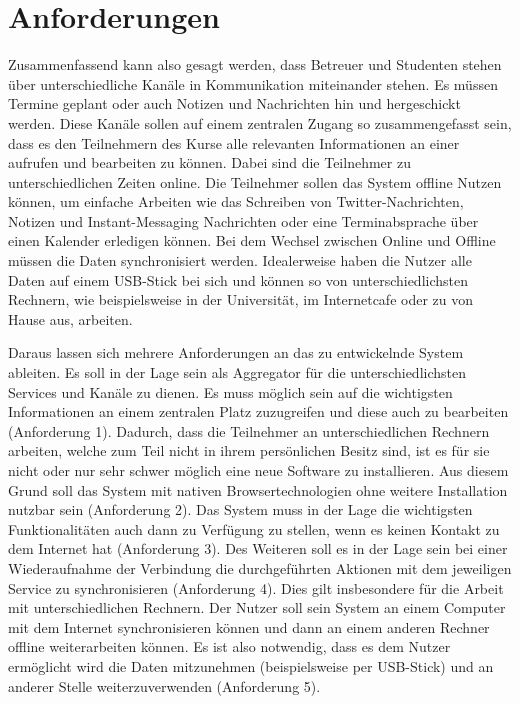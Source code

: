 \section{Anforderungen}\label{section:anforderungen_summary}
Zusammenfassend kann also gesagt werden, dass Betreuer und Studenten stehen über unterschiedliche Kanäle in Kommunikation miteinander stehen. Es müssen Termine geplant oder auch Notizen und Nachrichten hin und hergeschickt werden. Diese Kanäle sollen auf einem zentralen Zugang so zusammengefasst sein, dass es den Teilnehmern des Kurse alle relevanten Informationen an einer aufrufen und bearbeiten zu können. Dabei sind die Teilnehmer zu unterschiedlichen Zeiten online. Die Teilnehmer sollen das System offline Nutzen können, um einfache Arbeiten wie das Schreiben von Twitter-Nachrichten, Notizen und Instant-Messaging Nachrichten oder eine Terminabsprache über einen Kalender erledigen können. Bei dem Wechsel zwischen Online und Offline müssen die Daten synchronisiert werden. Idealerweise haben die Nutzer alle Daten auf einem USB-Stick bei sich und können so von unterschiedlichsten Rechnern, wie beispielsweise in der Universität, im Internetcafe oder zu von Hause aus, arbeiten.

Daraus lassen sich mehrere Anforderungen an das zu entwickelnde System ableiten. Es soll in der Lage sein als Aggregator für die unterschiedlichsten Services und Kanäle zu dienen. Es muss möglich sein auf die wichtigsten Informationen an einem zentralen Platz zuzugreifen und diese auch zu bearbeiten (Anforderung 1). Dadurch, dass die Teilnehmer an unterschiedlichen Rechnern arbeiten, welche zum Teil nicht in ihrem persönlichen Besitz sind, ist es für sie nicht oder nur sehr schwer möglich eine neue Software zu installieren. Aus diesem Grund soll das System mit nativen Browsertechnologien ohne weitere Installation nutzbar sein (Anforderung 2). Das System muss in der Lage die wichtigsten Funktionalitäten auch dann zu Verfügung zu stellen, wenn es keinen Kontakt zu dem Internet hat (Anforderung 3). Des Weiteren soll es in der Lage sein bei einer Wiederaufnahme der Verbindung die durchgeführten Aktionen mit dem jeweiligen Service zu synchronisieren (Anforderung 4). Dies gilt insbesondere für die Arbeit mit unterschiedlichen Rechnern. Der Nutzer soll sein System an einem Computer mit dem Internet synchronisieren können und dann an einem anderen Rechner offline weiterarbeiten können. Es ist also notwendig, dass es dem Nutzer ermöglicht wird die Daten mitzunehmen (beispielsweise per USB-Stick) und an anderer Stelle weiterzuverwenden (Anforderung 5). 

